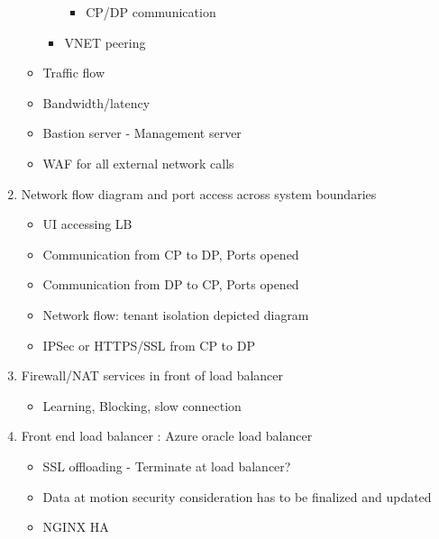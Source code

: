 \documentclass[letterpaper,10pt,english]{sphinxmanual}
\begin{document}
\begin{enumerate}
\begin{itemize}
\begin{itemize}
\begin{itemize}
\item {} 
CP/DP communication

\end{itemize}

\item {} 
VNET peering

\end{itemize}

\item {} 
Traffic flow

\item {} 
Bandwidth/latency

\item {} 
Bastion server - Management server

\item {} 
WAF for all external network calls

\end{itemize}

\item {} 
Network flow diagram and port access across system boundaries
\begin{itemize}
\item {} 
UI accessing LB

\item {} 
Communication from CP to DP, Ports opened

\item {} 
Communication from DP to CP, Ports opened

\item {} 
Network flow: tenant isolation depicted diagram

\item {} 
IPSec or HTTPS/SSL from CP to DP

\end{itemize}

\item {} 
Firewall/NAT services in front of load balancer
\begin{itemize}
\item {} 
Learning, Blocking, slow connection

\end{itemize}

\item {} 
Front end load balancer : Azure\textbar{} oracle load balancer
\begin{itemize}
\item {} 
SSL offloading  - Terminate at load balancer?

\item {} 
Data at motion security consideration has to be finalized and updated

\item {} 
NGINX  HA

\end{itemize}

\end{enumerate}
\end{document}
